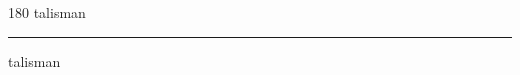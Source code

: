 
\begin{frame}
\begin{center}
\begin{turn}{180}
{\fontsize{2.5cm}{1em}\selectfont talisman}
\end{turn}
\vspace{1em}\par  
\hrule
\vspace{1em}\par  
{\fontsize{2.5cm}{1em}\selectfont talisman}
\end{center}
\end{frame}
